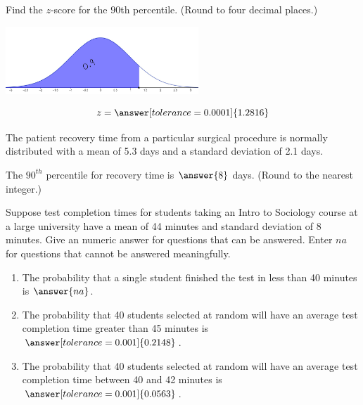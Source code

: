 \documentclass{ximera}
\begin{document}
\begin{problem}\label{prob:exam2prob6}
Find the $z$-score for the $90$th percentile.  (Round to four decimal places.)
\begin{image}
\includegraphics[height=1in]{test290thpercentile.JPG}
\end{image}
$$z=\answer[tolerance=0.0001]{1.2816}$$
\end{problem}

\begin{problem}\label{prob:exam2prob7}
The patient recovery time from a particular surgical
procedure is normally distributed with a mean of 5.3 days and a standard deviation of 2.1 days.  

The $90^{th}$ percentile for recovery time is $\answer{8}$ days. (Round to the nearest integer.)
\end{problem}

\begin{problem}\label{prob:exam2prob8}
Suppose test completion times for students taking an Intro to Sociology course at a large university have a mean of 44 minutes and standard deviation of 8 minutes.  Give an numeric answer for questions that can be answered.  Enter $na$ for questions that cannot be answered meaningfully.
\begin{enumerate}
\item The probability that a single student finished the test in less than 40 minutes is $\answer{na}$.
\item The probability that 40 students selected at random will have an average test completion time greater than 45 minutes is $\answer[tolerance=0.001]{0.2148}$.
\item The probability that 40 students selected at random will have an average test completion time between 40 and 42 minutes is $\answer[tolerance=0.001]{0.0563}$.
\end{enumerate}
\end{problem}
\end{document}
